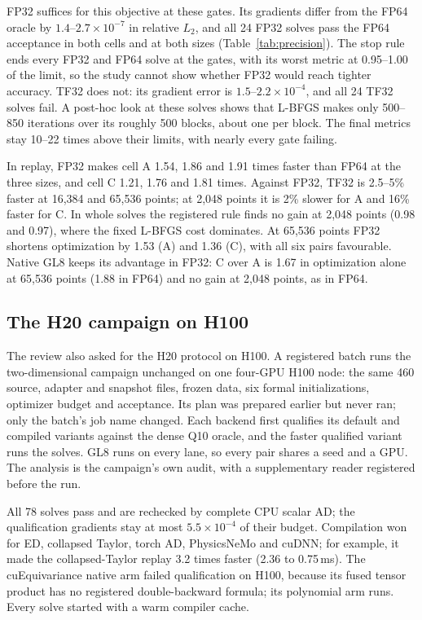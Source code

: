 \documentclass[11pt]{article}
\begin{document}
FP32 suffices for this objective at these gates. Its gradients differ from the FP64
oracle by $1.4$--$2.7\times10^{-7}$ in relative $L_2$, and all 24 FP32
solves pass the FP64 acceptance in both cells and at both sizes
(Table~\ref{tab:precision}). The stop rule ends every FP32 and FP64 solve
at the gates, with its worst metric at 0.95--1.00 of the limit, so the study
cannot show whether FP32 would reach tighter accuracy. TF32 does not: its gradient error is
$1.5$--$2.2\times10^{-4}$, and all 24 TF32 solves fail. A post-hoc look at
these solves shows that L-BFGS makes only 500--850 iterations over its
roughly 500 blocks, about one per block. The final metrics stay 10--22 times
above their limits, with nearly every gate failing.

In replay, FP32 makes cell A 1.54, 1.86 and 1.91 times faster than FP64 at
the three sizes, and cell C 1.21, 1.76 and 1.81 times. Against FP32, TF32
is 2.5--5\% faster at 16,384 and 65,536 points; at 2,048 points it is 2\%
slower for A and 16\% faster for C. In whole solves the registered rule finds no gain at 2,048
points (0.98 and 0.97), where the fixed L-BFGS cost dominates. At 65,536
points FP32 shortens optimization by 1.53 (A) and 1.36 (C), with all six
pairs favourable. Native GL8 keeps its advantage in FP32: C over A is 1.67
in optimization alone at 65,536 points (1.88 in FP64) and no gain at 2,048
points, as in FP64.

\subsection{The H20 campaign on H100}\label{sec:h100retest}
The review also asked for the H20 protocol on H100. A registered batch
runs the two-dimensional campaign unchanged on one four-GPU H100 node: the
same 460 source, adapter and snapshot files, frozen data, six formal
initializations, optimizer budget and acceptance. Its plan was prepared
earlier but never ran; only the batch's job name changed. Each backend
first qualifies its default and compiled variants against the dense Q10
oracle, and the faster qualified variant runs the solves. GL8 runs on every
lane, so every pair shares a seed and a GPU. The analysis is the campaign's
own audit, with a supplementary reader registered before the run.

All 78 solves pass and are rechecked by complete CPU scalar AD; the
qualification gradients stay at most $5.5\times10^{-4}$ of their budget.
Compilation won for ED, collapsed Taylor, torch AD, PhysicsNeMo and cuDNN;
for example, it made the collapsed-Taylor replay 3.2 times faster (2.36 to
0.75\,ms). The cuEquivariance native arm failed qualification on H100,
because its fused tensor product has no registered double-backward
formula; its polynomial arm runs. Every solve started with a warm compiler
cache.
\end{document}
